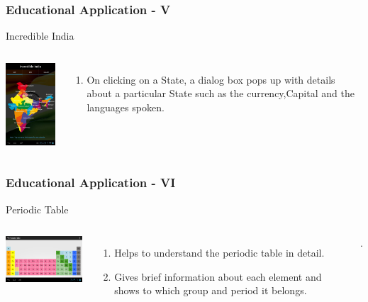 \documentclass[12pt]{beamer}
\begin{document}
\begin{frame}[c]
\frametitle{Educational Application - V}
\begin{block}{Incredible India}
 \begin{columns}[c]
   \includegraphics[width=4cm]{./app6.jpg}
  \begin{enumerate}
  \item \vskip-15pt On clicking on a State, a dialog box pops up with details about a particular State such as the currency,Capital and the languages spoken. 
 \end{enumerate}
 \end{columns}
\end{block}
\end{frame}


\begin{frame}[c]
\frametitle{Educational Application - VI}
\begin{block}{Periodic Table}
 \begin{columns}[c]
   \includegraphics[width=5cm]{./app7.jpg}
  \begin{enumerate}
 \item \vskip-5pt Helps to understand the periodic table in detail.
 \item Gives brief information about each element and shows to which group and period it belongs.
\end{enumerate}.
 \end{columns}
\end{block}
\end{frame}
\end{document}
